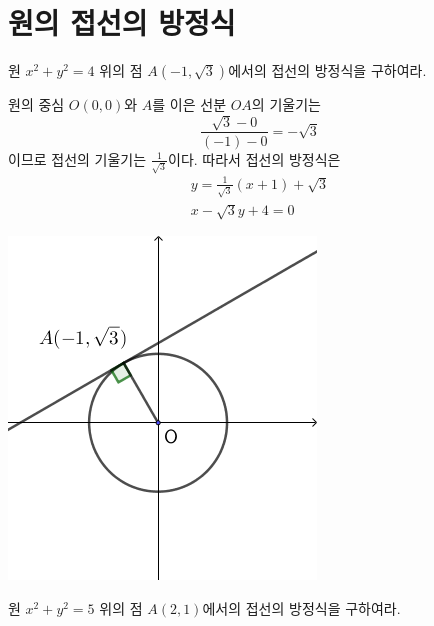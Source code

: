 \documentclass{oblivoir}
\begin{document}
\section{원의 접선의 방정식}
%
\exam{}\label{tangent1}
원 \(x^2+y^2=4\) 위의 점 \(A(-1,\sqrt3)\)에서의 접선의 방정식을 구하여라.
\begin{mdframed}
\begin{minipage}{0.6\textwidth}
원의 중심 \(O(0,0)\)와 \(A\)를 이은 선분 \(OA\)의 기울기는
\[\frac{\sqrt3-0}{(-1)-0}=-\sqrt3\]
이므로 접선의 기울기는 \(\frac1{\sqrt3}\)이다.
따라서 접선의 방정식은
\begin{gather*}
y=\frac1{\sqrt3}(x+1)+\sqrt3\\
x-\sqrt3y+4=0
\end{gather*}
\end{minipage}
\:\:
\begin{minipage}{0.35\textwidth}
\begin{center}
\includegraphics[width=\textwidth]{tangent_1}
\end{center}
\end{minipage}
\end{mdframed}

%
\prob{}\label{tangent2}
원 \(x^2+y^2=5\) 위의 점 \(A(2,1)\)에서의 접선의 방정식을 구하여라.
\end{document}
